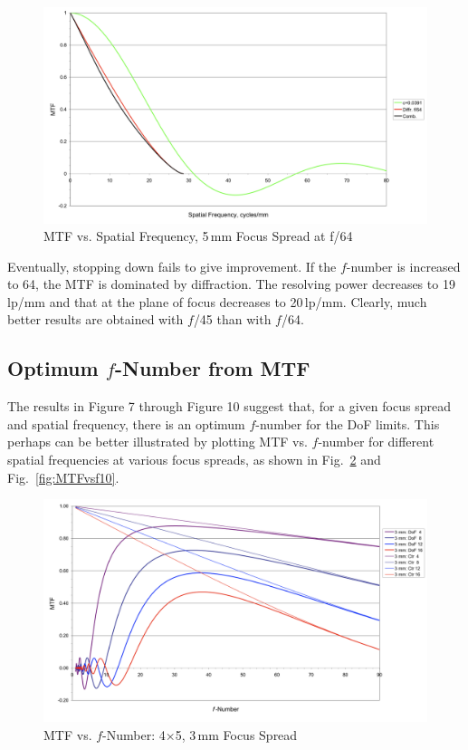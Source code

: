 \documentclass[11pt, oneside]{scrartcl}   	%
\begin{document}
\begin{figure}[htbp] %
   \centering
   \includegraphics[width=\linewidth]{figure/fig_dofd_10} 
   \caption{MTF vs. Spatial Frequency, 5\,mm Focus Spread at f/64}
   \label{fig:MTFvssf64}
\end{figure}
Eventually, stopping down fails to give improvement. If the $f$-number is increased to 64, the
MTF is dominated by diffraction. The resolving power decreases to 19\,lp/mm and that at the 
plane of focus decreases to 20\,lp/mm. Clearly, much better results are obtained with $f$/45 than with $f$/64.
\subsection{Optimum $f$-Number from MTF}

The results in Figure 7 through Figure 10 suggest that, for a given focus spread and spatial frequency, there is an optimum $f$-number for the DoF limits. This perhaps can be better illustrated by plotting MTF vs. $f$-number for different spatial frequencies at various focus spreads, as shown in Fig.~\ref{fig:MTFvsf3} and Fig.~\ref{fig:MTFvsf10}.
\begin{figure}[htbp] %
   \centering
   \includegraphics[width=\linewidth]{figure/fig_dofd_11} 
   \caption{MTF vs. $f$-Number: 4×5, 3\,mm Focus Spread}
   \label{fig:MTFvsf3}
\end{figure}
\end{document}
